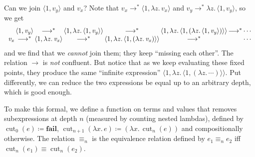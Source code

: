 \documentclass[acmsmall,review,dvipsnames]{acmart}
\newcommand{\Varid}[1]{\mathit{#1}}
\newcommand{\movesto}{\longrightarrow}
\begin{document}
Can we join \ensuremath{\langle{}\mathrm{1},\Varid{v}_{\Varid{y}}\rangle} and \ensuremath{\Varid{v}_{\Varid{x}}}? Note that $\ensuremath{\Varid{v}_{\Varid{x}}} \movesto^\ast \ensuremath{\langle{}\mathrm{1},\lambda\Varid{z}.\,\Varid{v}_{\Varid{x}}\rangle}$ and $\ensuremath{\Varid{v}_{\Varid{y}}} \movesto^\ast \ensuremath{\lambda\Varid{z}.\,\langle{}\mathrm{1},\Varid{v}_{\Varid{y}}\rangle}$, so we get
\[
\begin{array}{c@{\,}c@{\,}c@{\,}c@{\,}c@{\,}c@{\,}c@{\,}c}
& \ensuremath{\langle{}\mathrm{1},\Varid{v}_{\Varid{y}}\rangle} & \movesto^\ast & \ensuremath{\langle{}\mathrm{1},\lambda\Varid{z}.\,\langle{}\mathrm{1},\Varid{v}_{\Varid{y}}\rangle\rangle} & \movesto^\ast & \ensuremath{\langle{}\mathrm{1},\lambda\Varid{z}.\,\langle{}\mathrm{1},(\lambda\Varid{z}.\,\langle{}\mathrm{1},\Varid{v}_{\Varid{y}}\rangle)\rangle\rangle} & \movesto^\ast & \cdots \\
\ensuremath{\Varid{v}_{\Varid{x}}}     & \movesto^\ast & \ensuremath{\langle{}\mathrm{1},\lambda\Varid{z}.\,\Varid{v}_{\Varid{x}}\rangle} & \movesto^\ast & \ensuremath{\langle{}\mathrm{1},\lambda\Varid{z}.\,\langle{}\mathrm{1},(\lambda\Varid{z}.\,\Varid{v}_{\Varid{x}})\rangle\rangle} & \movesto^\ast && \cdots
\end{array}
\]
and we find that we \emph{cannot} join them; they keep “missing each other”. The relation $\movesto$ is \emph{not} confluent.
%
But notice that as we keep evaluating these fixed points, they produce the same “infinite expression” \ensuremath{\langle{}\mathrm{1},\lambda\Varid{z}.\,\langle{}\mathrm{1},(\lambda\Varid{z}.\,\cdots)\rangle\rangle}. Put differently, we can reduce the two expressions be equal up to an arbitrary depth, which is good enough.

\begin{definition}
To make this formal, we define a function on terms and values that removes subexpressions at depth $n$ (measured by counting nested lambdas), defined by
$\ensuremath{\operatorname{cut}_{\mathrm{0}}(\Varid{e})} \coloneqq \ensuremath{\textbf{fail}}$, $\ensuremath{\operatorname{cut}_{\Varid{n}\mathbin{+}\mathrm{1}}(\lambda\Varid{x}.\,\Varid{e})} \coloneqq \ensuremath{(\lambda\Varid{x}.\,\operatorname{cut}_{\Varid{n}}(\Varid{e}))}$ and compositionally otherwise.
The relation \ensuremath{\equiv_{\Varid{n}}} is the equivalence relation defined by \ensuremath{\Varid{e}_{\mathrm{1}}\equiv_{\Varid{n}}\Varid{e}_{\mathrm{2}}} iff \ensuremath{\operatorname{cut}_{\Varid{n}}(\Varid{e}_{\mathrm{1}})\mathrel{\equiv}\operatorname{cut}_{\Varid{n}}(\Varid{e}_{\mathrm{2}})}.
\end{definition}
\end{document}
